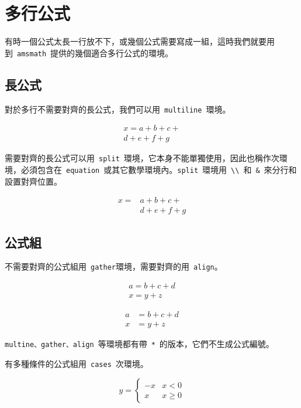 \section{多行公式}
有時一個公式太長一行放不下，或幾個公式需要寫成一組，這時我們就要用到~\verb|amsmath|~提供的幾個適合多行公式的環境。

\subsection{長公式}
對於多行不需要對齊的長公式，我們可以用~\verb|multiline|~環境。
\begin{demo}
\begin{multline}
x=a+b+c+\\
d+e+f+g
\end{multline}
\end{demo}

需要對齊的長公式可以用~\verb|split|~環境，它本身不能單獨使用，因此也稱作次環境，必須包含在~\verb|equation|~或其它數學環境內。\verb|split|~環境用~\verb|\\|~和~\verb|&|~來分行和設置對齊位置。
\begin{demo}
\[ \begin{split}
x=&a+b+c+\\
  &d+e+f+g
\end{split} \]
\end{demo}

\subsection{公式組}
不需要對齊的公式組用~\verb|gather|環境，需要對齊的用~\verb|align|。
\begin{demo}
\begin{gather}
a=b+c+d\\
x=y+z
\end{gather}
\end{demo}

\begin{demo}
\begin{align}
a&=b+c+d\\
x&=y+z
\end{align}
\end{demo}

\verb|multine、gather、align|~等環境都有帶~\verb|*|~的版本，它們不生成公式編號。

有多種條件的公式組用~\verb|cases|~次環境。
\begin{demo}
\[ y=\begin{cases}
-x & x<0\\
x & x\geq0
\end{cases} \]
\end{demo}

